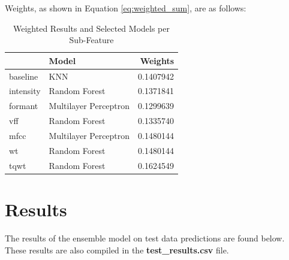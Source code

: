 \documentclass[
]{article}
\begin{document}
Weights, as shown in Equation \ref{eq:weighted_sum}, are as follows:

\begin{table}

\caption{\label{tab:unnamed-chunk-9}Weighted Results and Selected Models per Sub-Feature}
\centering
\begin{tabular}[t]{llr}
\toprule
  & Model & Weights\\
\midrule
baseline & KNN & 0.1407942\\
intensity & Random Forest & 0.1371841\\
formant & Multilayer Perceptron & 0.1299639\\
vff & Random Forest & 0.1335740\\
mfcc & Multilayer Perceptron & 0.1480144\\
\addlinespace
wt & Random Forest & 0.1480144\\
tqwt & Random Forest & 0.1624549\\
\bottomrule
\end{tabular}
\end{table}

\newpage

\hypertarget{results}{%
\section{Results}\label{results}}

The results of the ensemble model on test data predictions are found below. These results are also compiled in the \textbf{test\_results.csv} file.\\
\end{document}

